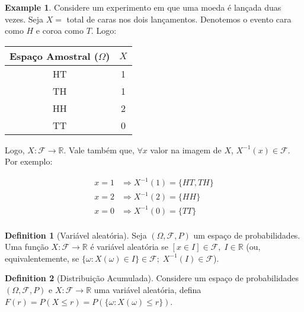 \documentclass[
]{article}
\theoremstyle{definition}
\newtheorem{definition}{Definition}[section]
\theoremstyle{definition}
\newtheorem{example}{Example}[section]
\theoremstyle{definition}
\theoremstyle{definition}
\theoremstyle{remark}
\begin{document}
\begin{example}
Considere um experimento em que uma moeda é lançada duas vezes. Seja \(X =\) total de caras nos dois lançamentos. Denotemos o evento cara como \(H\) e coroa como \(T\). Logo:

\begin{center}
\begin{tabular}{|c|c|} \toprule
Espaço Amostral ($\Omega$) & $X$ \\ \midrule
HT & 1 \\
TH & 1 \\
HH & 2 \\
TT & 0 \\ \bottomrule
\end{tabular}
\end{center}

Logo, \(X:\mathcal{F} \to \mathbb{R}\). Vale também que, \(\forall x\) valor na imagem de \(X\), \(X^{-1}(x) \in \mathcal{F}\). Por exemplo:

\begin{align*}
x = 1 &\Rightarrow X^{-1}(1) = \{HT,TH\} \\
x = 2 &\Rightarrow X^{-1}(2) = \{HH\} \\
x = 0 &\Rightarrow X^{-1}(0) = \{TT\} \\
\end{align*}
\end{example}

\begin{definition}[Variável aleatória]
Seja \((\Omega,\mathcal{F},P)\) um espaço de probabilidades. Uma função \(X:\mathcal{F} \to \mathbb{R}\) é variável aleatória se \([x \in I] \in \mathcal{F}, \; I \in \mathbb{R}\) (ou, equivalentemente, se \(\{\omega:X(\omega) \in I\} \in \mathcal{F}; \; X^{-1}(I) \in \mathcal{F}\)).
\end{definition}

\begin{definition}[Distribuição Acumulada]
Considere um espaço de probabilidades \((\Omega,\mathcal{F},P)\) e \(X:\mathcal{F} \to \mathbb{R}\) uma variável aleatória, defina \(F(r) = P(X \le r) = P(\{\omega : X(\omega) \le r\})\).
\end{definition}
\end{document}
